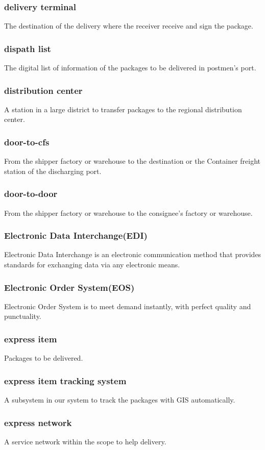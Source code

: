 \documentclass[12pt]{scrreprt}
\begin{document}
\begin{spacing}{0.7}
\subsubsection{delivery terminal}
The destination of the delivery where the receiver receive and sign the package.
\subsubsection{dispath list}
The digital list of information of the packages to be delivered in
postmen’s port.
\subsubsection{distribution center}
A station in a large district to transfer packages to the regional
distribution center.
\subsubsection{door-to-cfs}
From the shipper factory or warehouse to the destination or the
Container freight station of the discharging port.
\subsubsection{door-to-door}
From the shipper factory or warehouse to the consignee's factory
or warehouse.
\subsubsection{Electronic Data Interchange(EDI)}
Electronic Data Interchange is an electronic communication method that provides
standards for exchanging data via any electronic means.
\subsubsection{Electronic Order System(EOS)}
Electronic Order System is to meet demand instantly,
with perfect quality and punctuality.
\subsubsection{express item}
Packages to be delivered.
\subsubsection{express item tracking system}
A subsystem in our system to track the packages with GIS automatically.
\subsubsection{express network}
A service network within the scope to help delivery.

\end{spacing}
\end{document}
